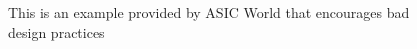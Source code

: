
\begin{figure}[t]
    \centering
    \caption{This is an example provided by ASIC World that encourages bad design practices \cite{asicworld}}
    \label{fig:asicworld}
\end{figure}
